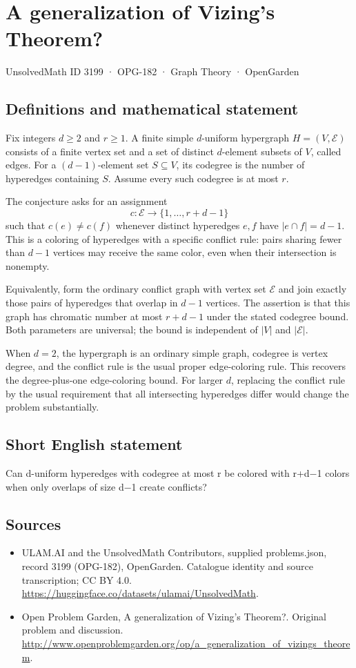 \documentclass[11pt,a4paper]{article}
\begin{document}
\section*{A generalization of Vizing's Theorem?}\label{3199}
{\small UnsolvedMath ID 3199 · OPG-182 · Graph Theory · OpenGarden}
\subsection{Definitions and mathematical statement}
Fix integers $d\ge2$ and $r\ge1$. A finite simple $d$-uniform hypergraph $H=(V,\mathcal E)$ consists of a finite vertex set and a set of distinct $d$-element subsets of $V$, called edges. For a $(d-1)$-element set $S\subseteq V$, its codegree is the number of hyperedges containing $S$. Assume every such codegree is at most $r$.

The conjecture asks for an assignment
\[
 c:\mathcal E\longrightarrow\{1,\ldots,r+d-1\}
\]
such that $c(e)\ne c(f)$ whenever distinct hyperedges $e,f$ have $|e\cap f|=d-1$. This is a coloring of hyperedges with a specific conflict rule: pairs sharing fewer than $d-1$ vertices may receive the same color, even when their intersection is nonempty.

Equivalently, form the ordinary conflict graph with vertex set $\mathcal E$ and join exactly those pairs of hyperedges that overlap in $d-1$ vertices. The assertion is that this graph has chromatic number at most $r+d-1$ under the stated codegree bound. Both parameters are universal; the bound is independent of $|V|$ and $|\mathcal E|$.

When $d=2$, the hypergraph is an ordinary simple graph, codegree is vertex degree, and the conflict rule is the usual proper edge-coloring rule. This recovers the degree-plus-one edge-coloring bound. For larger $d$, replacing the conflict rule by the usual requirement that all intersecting hyperedges differ would change the problem substantially.
\subsection{Short English statement}
Can d-uniform hyperedges with codegree at most r be colored with r+d−1 colors when only overlaps of size d−1 create conflicts?
\subsection{Sources}
\begin{itemize}
\item[S1] ULAM.AI and the UnsolvedMath Contributors, supplied problems.json, record 3199 (OPG-182), OpenGarden. Catalogue identity and source transcription; CC BY 4.0.
\url{https://huggingface.co/datasets/ulamai/UnsolvedMath}.
\item[S2] Open Problem Garden, A generalization of Vizing's Theorem?. Original problem and discussion.
\url{http://www.openproblemgarden.org/op/a_generalization_of_vizings_theorem}.
\end{itemize}
\end{document}
